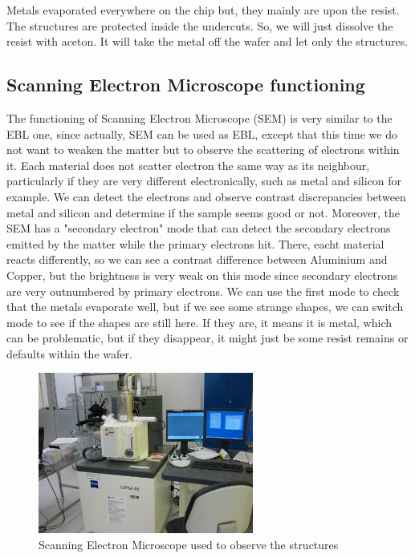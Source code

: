             Metals evaporated everywhere on the chip but, they mainly are upon the resist. The structures are protected inside the undercuts. So, we will just dissolve the resist with aceton. It will take the metal off the wafer and let only the structures.
            
        \subsection{Scanning Electron Microscope functioning}
            The functioning of Scanning Electron Microscope (SEM) is very similar to the EBL one, since actually, SEM can be used as EBL, except that this time we do not want to weaken the matter but to observe the scattering of electrons within it. Each material does not scatter electron the same way as its neighbour, particularly if they are very different electronically, such as metal and silicon for example. We can detect the electrons and observe contrast discrepancies between metal and silicon and determine if the sample seems good or not. Moreover, the SEM has a "secondary electron" mode that can detect the secondary electrons emitted by the matter while the primary electrons hit. There, eacht material reacts differently, so we can see a contrast difference between Aluminium and Copper, but the brightness is very weak on this mode since secondary electrons are very outnumbered by primary electrons. We can use the first mode to check that the metals evaporate well, but if we see some strange shapes, we can switch mode to see if the shapes are still here. If they are, it means it is metal, which can be problematic, but if they disappear, it might just be some resist remains or defaults within the wafer.

            \begin{figure}[H]
                \centering
                \includegraphics[width=200pt]{SEM.JPG}
                \caption{Scanning Electron Microscope used to observe the structures}
            \end{figure}
            
